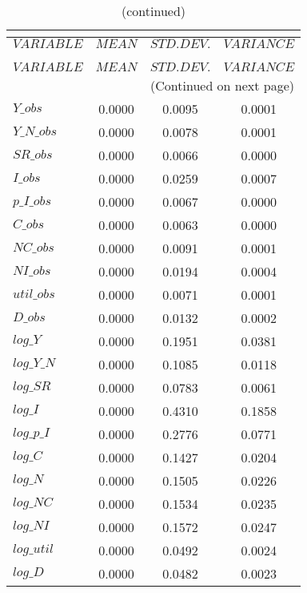  
\begin{center}
\begin{longtable}{lccc} 
\caption{THEORETICAL MOMENTS}\\
 \label{Table:th_moments}\\
\toprule 
$VARIABLE   $	 & 	 $         MEAN$	 & 	 $    STD. DEV.$	 & 	 $     VARIANCE$\\
\midrule \endfirsthead 
\caption{(continued)}\\
 \toprule \\ 
$VARIABLE   $	 & 	 $         MEAN$	 & 	 $    STD. DEV.$	 & 	 $     VARIANCE$\\
\midrule \endhead 
\midrule \multicolumn{4}{r}{(Continued on next page)} \\ \bottomrule \endfoot 
\bottomrule \endlastfoot 
$Y\_obs     $	 & 	       0.0000	 & 	       0.0095	 & 	       0.0001 \\ 
$Y\_N\_obs  $	 & 	       0.0000	 & 	       0.0078	 & 	       0.0001 \\ 
$SR\_obs    $	 & 	       0.0000	 & 	       0.0066	 & 	       0.0000 \\ 
$I\_obs     $	 & 	       0.0000	 & 	       0.0259	 & 	       0.0007 \\ 
$p\_I\_obs  $	 & 	       0.0000	 & 	       0.0067	 & 	       0.0000 \\ 
$C\_obs     $	 & 	       0.0000	 & 	       0.0063	 & 	       0.0000 \\ 
$NC\_obs    $	 & 	       0.0000	 & 	       0.0091	 & 	       0.0001 \\ 
$NI\_obs    $	 & 	       0.0000	 & 	       0.0194	 & 	       0.0004 \\ 
$util\_obs  $	 & 	       0.0000	 & 	       0.0071	 & 	       0.0001 \\ 
$D\_obs     $	 & 	       0.0000	 & 	       0.0132	 & 	       0.0002 \\ 
$log\_Y     $	 & 	       0.0000	 & 	       0.1951	 & 	       0.0381 \\ 
$log\_Y\_N  $	 & 	       0.0000	 & 	       0.1085	 & 	       0.0118 \\ 
$log\_SR    $	 & 	       0.0000	 & 	       0.0783	 & 	       0.0061 \\ 
$log\_I     $	 & 	       0.0000	 & 	       0.4310	 & 	       0.1858 \\ 
$log\_p\_I  $	 & 	       0.0000	 & 	       0.2776	 & 	       0.0771 \\ 
$log\_C     $	 & 	       0.0000	 & 	       0.1427	 & 	       0.0204 \\ 
$log\_N     $	 & 	       0.0000	 & 	       0.1505	 & 	       0.0226 \\ 
$log\_NC    $	 & 	       0.0000	 & 	       0.1534	 & 	       0.0235 \\ 
$log\_NI    $	 & 	       0.0000	 & 	       0.1572	 & 	       0.0247 \\ 
$log\_util  $	 & 	       0.0000	 & 	       0.0492	 & 	       0.0024 \\ 
$log\_D     $	 & 	       0.0000	 & 	       0.0482	 & 	       0.0023 \\ 
\end{longtable}
 \end{center}
